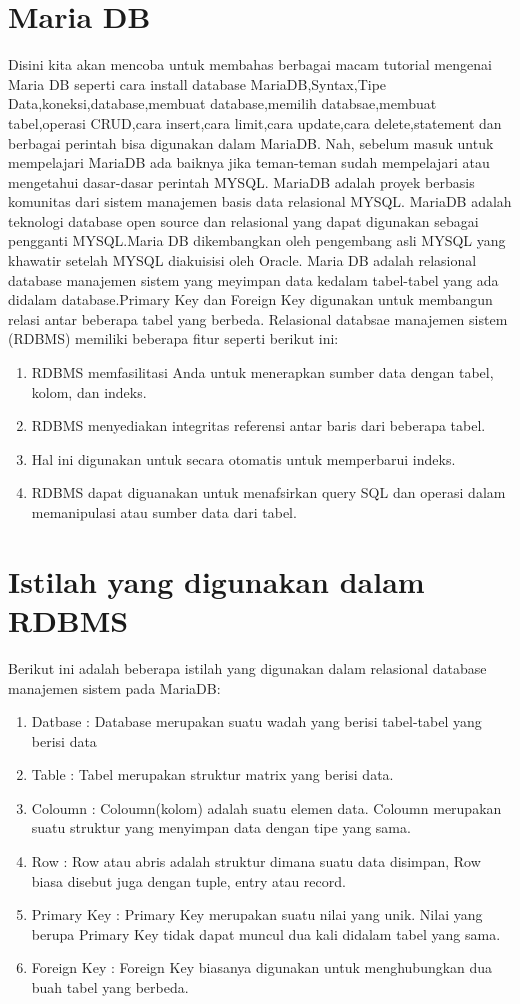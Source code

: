 \section{Maria DB}
\hfill \break
Disini kita akan mencoba untuk membahas berbagai macam tutorial mengenai Maria DB seperti cara install database MariaDB,Syntax,Tipe Data,koneksi,database,membuat database,memilih databsae,membuat tabel,operasi CRUD,cara insert,cara limit,cara update,cara delete,statement dan berbagai perintah bisa digunakan dalam MariaDB.
\hfill \break
Nah, sebelum masuk untuk mempelajari MariaDB ada baiknya jika teman-teman sudah mempelajari atau mengetahui dasar-dasar perintah MYSQL.
\hfill \break
MariaDB adalah proyek berbasis komunitas dari sistem manajemen basis data relasional MYSQL. MariaDB adalah teknologi database open source dan relasional yang dapat digunakan sebagai pengganti MYSQL.Maria DB dikembangkan oleh pengembang asli MYSQL yang khawatir setelah MYSQL diakuisisi oleh Oracle.
\hfill \break
Maria DB adalah relasional database manajemen sistem yang meyimpan data kedalam tabel-tabel yang ada didalam database.Primary Key dan Foreign Key digunakan untuk membangun relasi antar beberapa tabel yang berbeda.
\hfill \break
Relasional databsae manajemen sistem (RDBMS) memiliki beberapa fitur seperti berikut ini:
\begin{enumerate}
\item RDBMS memfasilitasi Anda untuk menerapkan sumber data dengan tabel, kolom, dan indeks.
\item RDBMS menyediakan integritas referensi antar baris dari beberapa tabel.
\item Hal ini digunakan untuk secara otomatis untuk memperbarui indeks.
\item RDBMS dapat diguanakan untuk menafsirkan query SQL dan operasi dalam memanipulasi atau sumber data dari tabel.
\end{enumerate}
\section{Istilah yang digunakan dalam RDBMS}
\hfill \break
Berikut ini adalah beberapa istilah yang digunakan dalam relasional database manajemen sistem pada MariaDB:
\begin{enumerate}
\item Datbase : Database merupakan suatu wadah yang berisi tabel-tabel yang berisi data
\item Table : Tabel merupakan struktur matrix yang berisi data.
\item Coloumn : Coloumn(kolom) adalah suatu elemen data. Coloumn merupakan suatu struktur yang menyimpan data dengan tipe yang sama.
\item Row : Row atau abris adalah struktur dimana suatu data disimpan, Row biasa disebut juga dengan tuple, entry atau record.
\item Primary Key : Primary Key merupakan suatu nilai yang unik. Nilai yang berupa Primary Key tidak dapat muncul dua kali didalam tabel yang sama.
\item Foreign Key : Foreign Key biasanya digunakan untuk menghubungkan dua buah tabel yang berbeda.
\end{enumerate}
